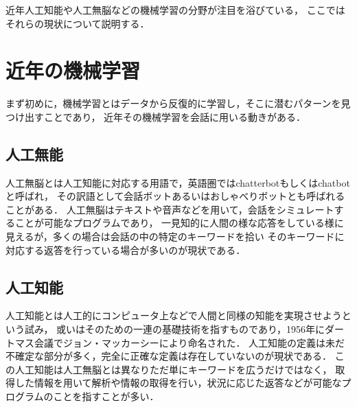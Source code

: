 近年人工知能や人工無脳などの機械学習の分野が注目を浴びている，
ここではそれらの現状について説明する．

\section{近年の機械学習}
まず初めに，機械学習とはデータから反復的に学習し，そこに潜むパターンを見つけ出すことであり，
近年その機械学習を会話に用いる動きがある．

\subsection{人工無能}
人工無脳\cite{muno}とは人工知能\cite{tino}に対応する用語で，英語圏ではchatterbotもしくはchatbotと呼ばれ，
その訳語として会話ボットあるいはおしゃべりボットとも呼ばれることがある．
人工無脳はテキストや音声などを用いて，会話をシミュレートすることが可能なプログラムであり，
一見知的に人間の様な応答をしている様に見えるが，多くの場合は会話の中の特定のキーワードを拾い
そのキーワードに対応する返答を行っている場合が多いのが現状である．

\subsection{人工知能}
人工知能とは人工的にコンピュータ上などで人間と同様の知能を実現させようという試み，
或いはそのための一連の基礎技術を指すものであり，1956年にダートマス会議でジョン・マッカーシーにより命名された．
人工知能の定義は未だ不確定な部分が多く，完全に正確な定義は存在していないのが現状である．
この人工知能は人工無脳とは異なりただ単にキーワードを広うだけではなく，
取得した情報を用いて解析や情報の取得を行い，状況に応じた返答などが可能なプログラムのことを指すことが多い．

%
%
%
%
